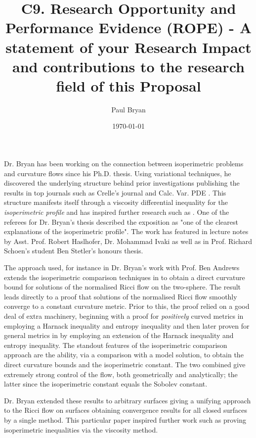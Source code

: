 \documentclass[12pt]{amsart}
\date{}
\author{Paul Bryan}
\date{\today}
\title{C9. Research Opportunity and Performance Evidence (ROPE) - A statement of your Research Impact and contributions to the research field of this Proposal}
\begin{document}
Dr. Bryan has been working on the connection between isoperimetric problems and curvature flows since his Ph.D. thesis. Using variational techniques, he discovered the underlying structure behind prior investigations \cite{MR1369140,MR1369139,MR1656553} publishing the results in top journals such as Crelle's journal and Calc. Var. PDE \cite{MR2729306,MR2794630,MR2843240,Bryan}. This structure manifests itself through a viscosity differential inequality for the \emph{isoperimetric profile} and has inspired further research such as \cite{MR3544942, MR3570462}. One of the referees for Dr. Bryan's thesis described the exposition as "one of the clearest explanations of the isoperimetric profile". The work has featured in lecture notes by Asst. Prof. Robert Haslhofer, Dr. Mohammad Ivaki as well as in Prof. Richard Schoen's student Ben Stetler's honours thesis.

The approach used, for instance in Dr. Bryan's work with Prof. Ben Andrews \cite{MR2729306} extends the isoperimetric comparison techniques in \cite{MR1369140,MR1369139} to obtain a direct curvature bound for solutions of the normalised Ricci flow on the two-sphere. The result leads directly to a proof that solutions of the normalised Ricci flow smoothly converge to a constant curvature metric. Prior to this, the proof relied on a good deal of extra machinery, beginning with a proof for \emph{positively} curved metrics in \cite{MR954419} employing a Harnack inequality and entropy inequality and then later proven for general metrics in \cite{MR1094458} by employing an extension of the Harnack inequality and entropy inequality. The standout features of the isoperimetric comparison approach are the ability, via a comparison with a model solution, to obtain the direct curvature bounds and the isoperimetric constant. The two combined give extremely strong control of the flow, both geometrically and analytically; the latter since the isoperimetric constant equals the Sobolev constant.

Dr. Bryan extended these results to arbitrary surfaces \cite{Bryan} giving a unifying approach to the Ricci flow on surfaces obtaining convergence results for all closed surfaces by a single method. This particular paper inspired further work such as \cite{MR3544942} proving isoperimetric inequalities via the viscosity method.
\end{document}
